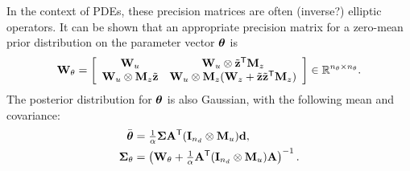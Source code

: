 In the context of PDEs, these precision matrices are often {\color{royalblue}(inverse?)} elliptic operators.
It can be shown that an appropriate precision matrix for a zero-mean prior distribution on the parameter vector $\boldsymbol{\theta}$ is
\begin{align}
    \label{eq:prior-parameter-precision}
    \mathbf{W}_\theta
    = \left[\begin{array}{cc}
        \mathbf{W}_u & \mathbf{W}_u \otimes \tilde{\mathbf{z}}^{\mathsf{T}}\mathbf{M}_z \\
        \mathbf{W}_u\otimes\mathbf{M}_z\tilde{\mathbf{z}} & \mathbf{W}_u\otimes\mathbf{M}_z(\mathbf{W}_z + \tilde{\mathbf{z}}\tilde{\mathbf{z}}^{\mathsf{T}}\mathbf{M}_z)
    \end{array}\right]
    \in\mathbb{R}^{n_\theta \times n_\theta}.
\end{align}
The posterior distribution for $\boldsymbol{\theta}$ is also Gaussian, with the following mean and covariance:
\begin{subequations}
\label{eq:posterior-parameter-distribution}
\begin{align}
    \bar{\boldsymbol{\theta}}
    &= \tfrac{1}{\alpha}\boldsymbol{\Sigma}\mathbf{A}^{\mathsf{T}}(\mathbf{I}_{n_d}\otimes\mathbf{M}_{u})\mathbf{d},
    \\
    \boldsymbol{\Sigma}_\theta
    &= \left(\mathbf{W}_{\theta} + \tfrac{1}{\alpha}\mathbf{A}^{\mathsf{T}}(\mathbf{I}_{n_d}\otimes \mathbf{M}_u)\mathbf{A}\right)^{-1}.
\end{align}
\end{subequations}

